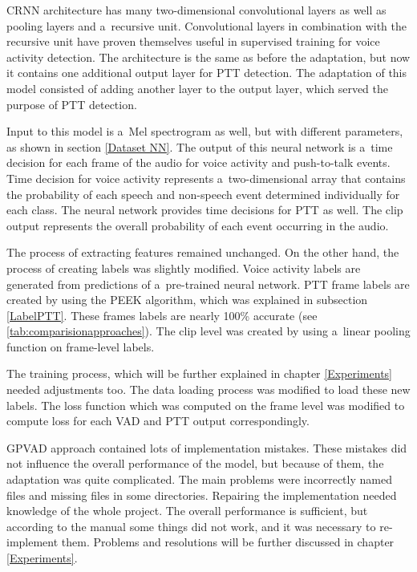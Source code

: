     CRNN architecture has many two-dimensional convolutional layers as well as pooling layers and a~recursive unit. Convolutional layers in combination with the recursive unit have proven themselves useful in supervised training for voice activity detection. The architecture is the same as before the adaptation, but now it contains one additional output layer for PTT detection. The adaptation of this model consisted of adding another layer to the output layer, which served the purpose of PTT detection. 
    
    Input to this model is a~Mel spectrogram as well, but with different parameters, as shown in section \ref{Dataset NN}. 
    The output of this neural network is a~time decision for each frame of the audio for voice activity and push-to-talk events. Time decision for voice activity represents a~two-dimensional array that contains the probability of each speech and non-speech event determined individually for each class. The neural network provides time decisions for PTT as well. The clip output represents the overall probability of each event occurring in the audio.

    The process of extracting features remained unchanged. On the other hand, the process of creating labels was slightly modified. Voice activity labels are generated from predictions of a~pre-trained neural network. PTT frame labels are created by using the PEEK algorithm, which was explained in subsection \ref{LabelPTT}. These frames labels are nearly 100\% accurate (see \ref{tab:comparisionapproaches}).
    The clip level was created by using a~linear pooling function on frame-level labels. 

    The training process, which will be further explained in chapter \ref{Experiments} needed adjustments too. The data loading process was modified to load these new labels. 
    The loss function which was computed on the frame level was modified to compute loss for each VAD and PTT output correspondingly. 

    GPVAD approach contained lots of implementation mistakes. These mistakes did not influence the overall performance of the model, but because of them, the adaptation was quite complicated. The main problems were incorrectly named files and missing files in some directories. Repairing the implementation needed knowledge of the whole project. The overall performance is sufficient, but according to the manual some things did not work, and it was necessary to re-implement them. Problems and resolutions will be further discussed in chapter \ref{Experiments}.

